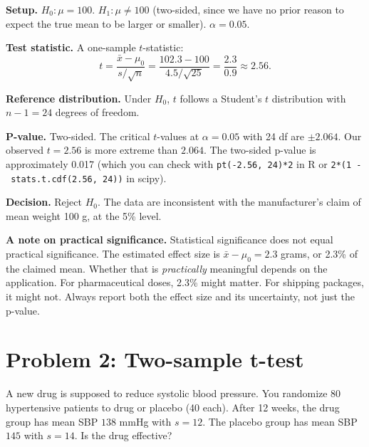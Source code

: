 \documentclass[
  letterpaper,
  11pt,
  twoside,
  openany]{scrbook}
\begin{document}
\begin{tcolorbox}[enhanced jigsaw, arc=.35mm, bottomrule=.15mm, bottomtitle=1mm, breakable, colback=white, colbacktitle=quarto-callout-note-color!10!white, colframe=quarto-callout-note-color-frame, coltitle=black, left=2mm, leftrule=.75mm, opacityback=0, opacitybacktitle=0.6, rightrule=.15mm, title=\textcolor{quarto-callout-note-color}{\faInfo}\hspace{0.5em}{Solution to Problem 1}, titlerule=0mm, toprule=.15mm, toptitle=1mm]

\textbf{Setup.} \(H_0: \mu = 100\). \(H_1: \mu \neq 100\) (two-sided,
since we have no prior reason to expect the true mean to be larger or
smaller). \(\alpha = 0.05\).

\textbf{Test statistic.} A one-sample \(t\)-statistic: \[
t = \frac{\bar{x} - \mu_0}{s / \sqrt{n}} = \frac{102.3 - 100}{4.5 / \sqrt{25}} = \frac{2.3}{0.9} \approx 2.56.
\]

\textbf{Reference distribution.} Under \(H_0\), \(t\) follows a
Student's \(t\) distribution with \(n - 1 = 24\) degrees of freedom.

\textbf{P-value.} Two-sided. The critical \(t\)-values at
\(\alpha = 0.05\) with 24 df are \(\pm 2.064\). Our observed
\(t = 2.56\) is more extreme than \(2.064\). The two-sided p-value is
approximately 0.017 (which you can check with \texttt{pt(-2.56,\ 24)*2}
in R or \texttt{2*(1\ -\ stats.t.cdf(2.56,\ 24))} in scipy).

\textbf{Decision.} Reject \(H_0\). The data are inconsistent with the
manufacturer's claim of mean weight 100 g, at the 5\% level.

\textbf{A note on practical significance.} Statistical significance does
not equal practical significance. The estimated effect size is
\(\bar{x} - \mu_0 = 2.3\) grams, or 2.3\% of the claimed mean. Whether
that is \emph{practically} meaningful depends on the application. For
pharmaceutical doses, 2.3\% might matter. For shipping packages, it
might not. Always report both the effect size and its uncertainty, not
just the p-value.

\end{tcolorbox}

\section{Problem 2: Two-sample
t-test}\label{problem-2-two-sample-t-test}

A new drug is supposed to reduce systolic blood pressure. You randomize
80 hypertensive patients to drug or placebo (40 each). After 12 weeks,
the drug group has mean SBP \(138\) mmHg with \(s = 12\). The placebo
group has mean SBP \(145\) with \(s = 14\). Is the drug effective?
\end{document}
